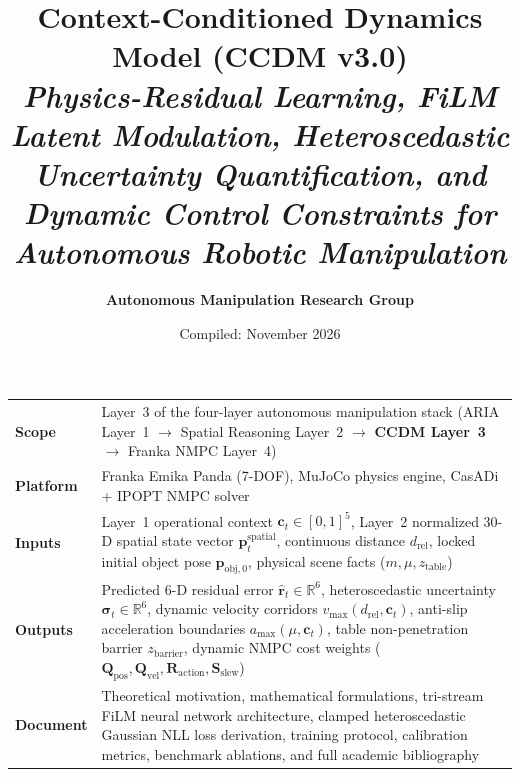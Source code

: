 \documentclass[10pt,a4paper]{article}
\title{
  \vspace{-1.0cm}
  {\Huge\textbf{\color{navy} Context-Conditioned Dynamics Model (CCDM v3.0)}}\\[0.4cm]
  {\large\textit{\color{medgray} Physics-Residual Learning, FiLM Latent Modulation, Heteroscedastic Uncertainty Quantification, and Dynamic Control Constraints for Autonomous Robotic Manipulation}}
}
\author{\textbf{Autonomous Manipulation Research Group}}
\date{\small Compiled: November 2026}
\begin{document}
\maketitle
\thispagestyle{empty}

\begin{table}[h]
\centering
\small
\begin{tabularx}{\linewidth}{p{2.6cm}X}
\toprule
\textbf{Scope} & Layer~3 of the four-layer autonomous manipulation stack (\textsf{ARIA Layer~1} $\rightarrow$ \textsf{Spatial Reasoning Layer~2} $\rightarrow$ \textbf{CCDM Layer~3} $\rightarrow$ \textsf{Franka NMPC Layer~4}) \\
\textbf{Platform} & Franka Emika Panda (7-DOF), MuJoCo physics engine, CasADi + IPOPT NMPC solver \\
\textbf{Inputs} & Layer~1 operational context $\mathbf{c}_t \in [0, 1]^5$, Layer~2 normalized 30-D spatial state vector $\mathbf{p}_t^{\mathrm{spatial}}$, continuous distance $d_{\mathrm{rel}}$, locked initial object pose $\mathbf{p}_{\mathrm{obj},0}$, physical scene facts ($m, \mu, z_{\mathrm{table}}$) \\
\textbf{Outputs} & Predicted 6-D residual error $\hat{\mathbf{r}}_t \in \mathbb{R}^6$, heteroscedastic uncertainty $\bm{\sigma}_t \in \mathbb{R}^6$, dynamic velocity corridors $v_{\mathrm{max}}(d_{\mathrm{rel}}, \mathbf{c}_t)$, anti-slip acceleration boundaries $a_{\mathrm{max}}(\mu, \mathbf{c}_t)$, table non-penetration barrier $z_{\mathrm{barrier}}$, dynamic NMPC cost weights ($\mathbf{Q}_{\mathrm{pos}}, \mathbf{Q}_{\mathrm{vel}}, \mathbf{R}_{\mathrm{action}}, \mathbf{S}_{\mathrm{slew}}$) \\
\textbf{Document} & Theoretical motivation, mathematical formulations, tri-stream FiLM neural network architecture, clamped heteroscedastic Gaussian NLL loss derivation, training protocol, calibration metrics, benchmark ablations, and full academic bibliography \\
\bottomrule
\end{tabularx}
\end{table}
\end{document}
